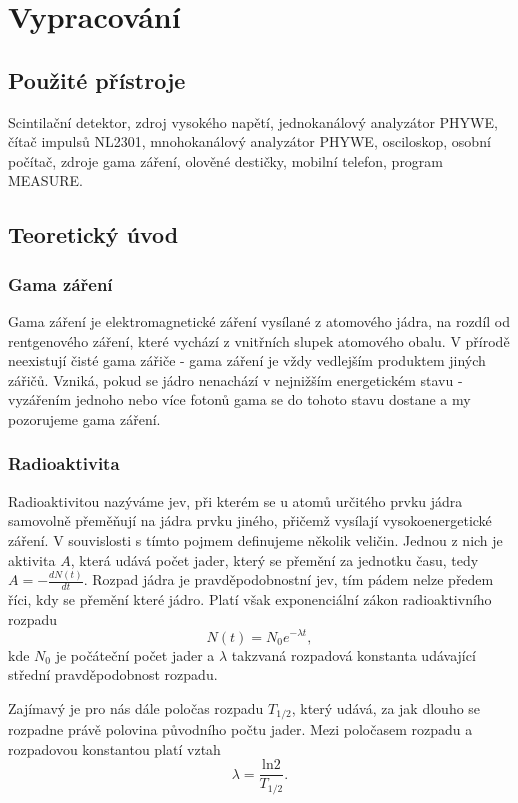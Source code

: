\documentclass[english]{article}
\begin{document}
\section{Vypracování}

	\subsection{Použité přístroje}
		Scintilační detektor, zdroj vysokého napětí, jednokanálový analyzátor PHYWE, čítač impulsů NL2301, mnohokanálový analyzátor PHYWE, osciloskop, osobní počítač, zdroje gama záření, olověné destičky, mobilní telefon, program MEASURE.
						
	\subsection{Teoretický úvod}
			\subsubsection{Gama záření}
				Gama záření je elektromagnetické záření vysílané z atomového jádra, na rozdíl od rentgenového záření, které vychází z vnitřních slupek atomového obalu. V přírodě neexistují čisté gama zářiče - gama záření je vždy vedlejším produktem jiných zářičů. Vzniká, pokud se jádro nenachází v nejnižším energetickém stavu - vyzářením jednoho nebo více fotonů gama se do tohoto stavu dostane a my pozorujeme gama záření. 
			
			\subsubsection{Radioaktivita}
				Radioaktivitou nazýváme jev, při kterém se u atomů určitého prvku jádra samovolně přeměňují na jádra prvku jiného, přičemž vysílají vysokoenergetické záření. V souvislosti s tímto pojmem definujeme několik veličin. Jednou z nich je aktivita $A$, která udává počet jader, který se přemění za jednotku času, tedy $A=-\frac{dN(t)}{dt}$. Rozpad jádra je pravděpodobnostní jev, tím pádem nelze předem říci, kdy se přemění které jádro. Platí však exponenciální zákon radioaktivního rozpadu
				\begin{equation}
				N(t) = N_0e^{-\lambda t},
				\end{equation}
				kde $N_0$ je počáteční počet jader a $\lambda$ takzvaná rozpadová konstanta udávající střední pravděpodobnost rozpadu. 
				
				Zajímavý je pro nás dále poločas rozpadu $T_{1/2}$, který udává, za jak dlouho se rozpadne právě polovina původního počtu jader. Mezi poločasem rozpadu a rozpadovou konstantou platí vztah
				\begin{equation}
				\lambda = \frac{\mathrm{ln} 2}{T_{1/2}}.
				\end{equation}
			
\end{document}
